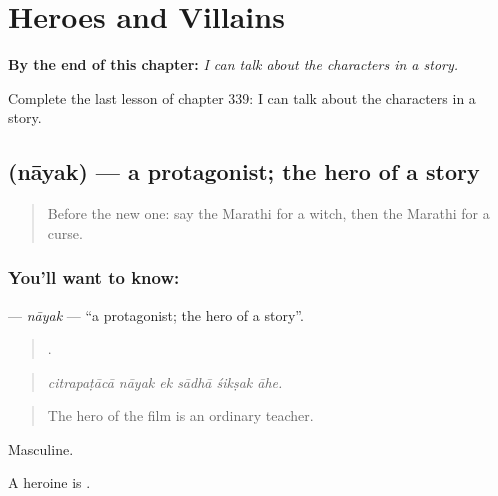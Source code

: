 
\chapter{Heroes and Villains}
\label{ch:mr-heroes-and-villains}

\begin{chapteropening}
\textbf{By the end of this chapter:} \emph{I can talk about the characters in a story.}

Complete the last lesson of chapter 339: I can talk about the characters in a story.
\end{chapteropening}

\section[\texorpdfstring{\mr{नायक} (nāyak)}{नायक (nāyak)}]{ (nāyak) — a protagonist; the hero of a story}

\label{lesson:MR-C339-nayak}



\begin{quote}
Before the new one: say the Marathi for a witch, then the Marathi for a curse.
\end{quote}

\subsection*{You'll want to know: }
\textbf{} — \emph{nāyak} — \textquotedblleft{}a protagonist; the hero of a story\textquotedblright{}.

\begin{quote}
     .
\end{quote}

\begin{quote}
\emph{citrapaṭācā nāyak ek sādhā śikṣak āhe.}
\end{quote}

\begin{quote}
The hero of the film is an ordinary teacher.
\end{quote}

Masculine.

A heroine is .

